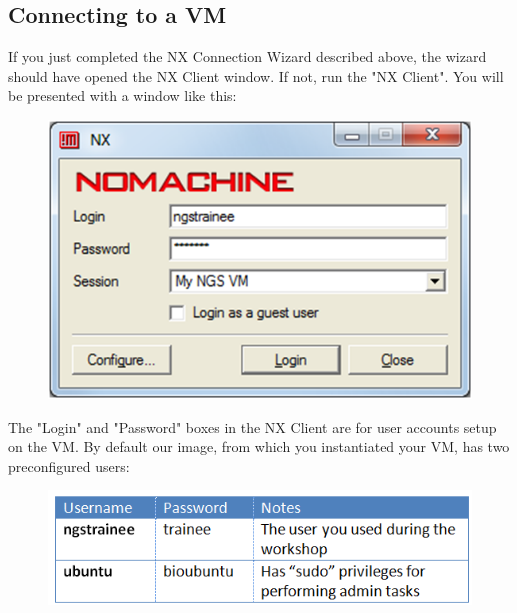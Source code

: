 \subsection{Connecting to a VM}
If you just completed the NX Connection Wizard described above, the wizard
should have opened the NX Client window. If not, run the "NX Client". You will
be presented with a window like this:
\begin{figure}[H]
  \centering
  \includegraphics[scale=0.5]{post-workshop/nx_client/login.png}
  \caption{\label{fig:nx_login}}
\end{figure}

The "Login" and "Password" boxes in the NX Client are for user accounts setup on
the VM. By default our image, from which you instantiated your VM, has two
preconfigured users:
\begin{figure}[H]
  \centering
  \includegraphics[scale=0.5]{post-workshop/nx_client/usernames_passwords.png}
  \caption{\label{fig:nx_usernames_passwords}}
\end{figure}

